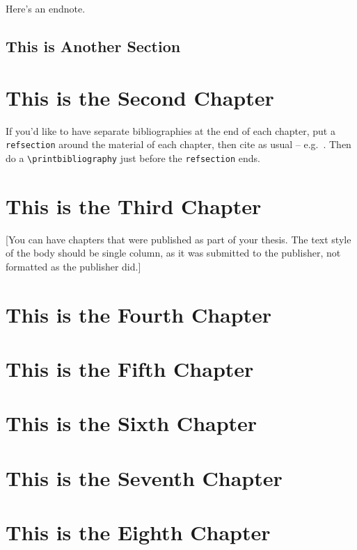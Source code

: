 \documentclass[12pt]{caltech_thesis}
\begin{document}
\lipsum[3] 

\lipsum[4-5] 

Here's an endnote.

\section{This is Another Section}
\lipsum[6-7] 

\chapter{This is the Second Chapter}
\begin{refsection}
If you'd like to have separate bibliographies at the end of each chapter, put a \verb|refsection| around the material of each chapter, then cite as usual -- e.g.~\citep{GMP81,Ful83}. Then do a \verb|\printbibliography| just before the \verb|refsection| ends. 

\printbibliography[heading=subbibliography]
\end{refsection}


\chapter{This is the Third Chapter}


[You can have chapters that were published as part of your thesis. The text style of the body should be single column, as it was submitted to the publisher, not formatted as the publisher did.]

\chapter{This is the Fourth Chapter}
\chapter{This is the Fifth Chapter}
\chapter{This is the Sixth Chapter}
\chapter{This is the Seventh Chapter}
\chapter{This is the Eighth Chapter}

\printbibliography[heading=bibintoc]
\end{document}
